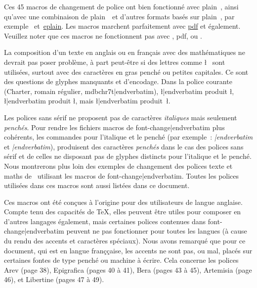Ces 45 macros de changement de police ont bien fonctionn\'e avec plain~\capstex, ainsi qu'avec une combinaison de plain~\capstex\ et d'autres formats bas\'es sur plain~\capstex, par exemple~  \href{http://www.tex.ac.uk/tex-archive/help/Catalogue/entries/amstex.html}{\amstex} et~\href{http://www.tex.ac.uk/tex-archive/help/Catalogue/entries/eplain.html}{eplain}. Les macros marchent parfaitement avec \href{http://www.tex.ac.uk/tex-archive/help/Catalogue/entries/pdftex.html}{pdf\capstex} et \href{http://scripts.sil.org/cms/scripts/page.php?site_id=nrsi&id=xetex}{\capsxetex} \'egalement. Veuillez noter que ces macros ne fonctionnent pas avec \href{http://www.tex.ac.uk/tex-archive/help/Catalogue/entries/latex.html}{\capslatex}, pdf\capslatex{}, ou \capsxelatex.

La composition d'un texte en anglais ou en fran\c cais avec des math\'ematiques ne devrait pas poser probl\`eme, \`a part peut-\^etre si des lettres comme \l~ sont utilis\'ees, surtout avec des caract\`eres en {\slbf gras pench\'e\/} ou {\caps petites capitales}. Ce sont des questions de glyphes manquants et d'encodage. Dans la police courante (Charter, romain r\'egulier, {\verbatim mdbchr7t|endverbatim}), {\color{brown}\verbatim\l|endverbatim} produit \l, {\color{brown}\verbatim\slbf \l|endverbatim} produit {\slbf \l}, mais {\color{brown}\verbatim\caps\l|endverbatim} produit~{\caps \l}.





Les polices sans s\'erif ne proposent pas de caract\`eres {\it italiques} mais seulement {\sl pench\'es\/}. Pour rendre les fichiers macros de {\color{brown}\verbatim font-change|endverbatim} plus coh\'erents, les commandes pour l'italique et le pench\'e (par exemple~: {\color{brown}\verbatim\it|endverbatim} et {\color{brown}\verbatim\sl|endverbatim}), produisent des caract\`eres {\sl pench\'es} dans le cas des polices sans s\'erif et de celles ne disposant pas de glyphes distincts pour l'italique et le pench\'e. Nous montrerons plus loin des exemples de changement des polices texte et maths de \capstex\ utilisant les macros de {\color{brown}\verbatim font-change|endverbatim}. Toutes les polices utilis\'ees dans ces macros sont aussi list\'ees dans ce document.


Ces macros ont \'et\'e con\c{c}ues \`a l'origine pour des utilisateurs de langue anglaise. Compte tenu des capacit\'es de \TeX, elles peuvent \^etre utiles pour composer en d'autres langages \'egalement, mais certaines polices contenues dans {\color{brown}\verbatim font-change|endverbatim} peuvent ne pas fonctionner pour toutes les langues (\`a cause du rendu des accents et caract\`eres sp\'eciaux). Nous avons remarqu\'e que pour ce document, qui est en langue franç\c{c}aise, les accents ne sont pas, ou mal, plac\'es sur certaines fontes de type pench\'e ou machine \`a \'ecrire. Cela concerne les polices Arev (page 38), Epigrafica (pages 40 \`a 41), Bera (pages 43 \`a 45), Artemisia (page 46), et Libertine (pages 47 \`a 49).


